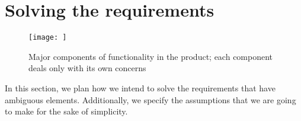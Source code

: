 \section{Solving the requirements} \label{solvingRequirements}

\begin{figure}[ht]
    \texttt{[image: ]}
    \caption{Major components of functionality in the product; each component deals only with its own concerns}
    \label{fig:components}
\end{figure}



In this section, we plan how we intend to solve the requirements that have ambiguous elements. Additionally, we specify the assumptions that we are going to make for the sake of simplicity. 

